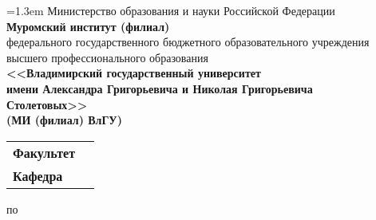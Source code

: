 \newlength{\frontpagefk} %
\setlength{\frontpagefk}{6cm}
\newlength{\frontpagerb} %
\setlength{\frontpagerb}{6cm}
\newlength{\frontpagerbspace} %
\setlength{\frontpagerbspace}{1cm}
\newlength{\FrontPageSubjSpace} %
\setlength{\FrontPageSubjSpace}{1cm}
\newlength{\FrontPageTopicSpace} %
\setlength{\FrontPageTopicSpace}{0.5cm}

\thispagestyle{empty}
\begin{center}
{
\vspace*{-1.5cm}
\baselineskip=1.3em
{\small Министерство образования и науки Российской Федерации}\\
\textbf{Муромский институт (филиал)}\\
{\footnotesize федерального государственного бюджетного образовательного учреждения\\
высшего профессионального образования}\\
\textbf{<<Владимирский государственный университет\\
имени Александра Григорьевича и Николая Григорьевича\\
Столетовых>>\\
(МИ (филиал) ВлГУ)\\}
}

\bigskip
\begin{tabular}{l c}
\textbf{Факультет}&\underline{\makebox[\frontpagefk]{\FrontPageDepartment}}\\
\textbf{Кафедра}&\underline{\makebox[\frontpagefk]{\FrontPageSubdepartment}}\\
\end{tabular}

\vspace{\fill}
\begin{Huge}
\textbf{\textsl{\WorkType}}
\end{Huge}

\vspace{\fill}
по \underline{\makebox[\FrontPageSubjSpace]{}\Subject\makebox[\FrontPageSubjSpace]{}}

\smallskip
\parbox{15cm}{}

\vspace{\fill}

\begin{flushright}


\end{flushright}
\end{center}
